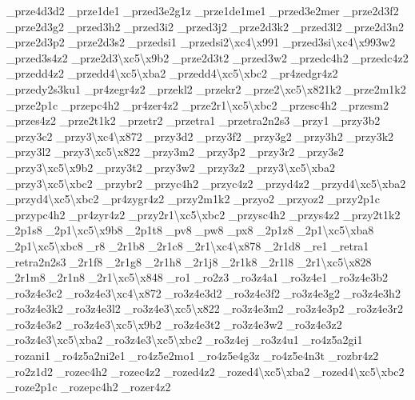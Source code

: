 \begin{DoxyCompactItemize}
\-\_\-prze4d3d2 \-\_\-prze1de1 \-\_\-przed3e2g1z \-\_\-prze1de1me1 \-\_\-przed3e2mer \-\_\-prze2d3f2 \-\_\-prze2d3g2 \-\_\-przed3h2 \-\_\-przed3i2 \-\_\-przed3j2 \-\_\-prze2d3k2 \-\_\-przed3l2 \-\_\-prze2d3n2 \-\_\-prze2d3p2 \-\_\-prze2d3s2 \-\_\-przedsi1 \-\_\-przedsi2\textbackslash{}xc4\textbackslash{}x991 \-\_\-przed3si\textbackslash{}xc4\textbackslash{}x993w2 \-\_\-przed3s4z2 \-\_\-prze2d3\textbackslash{}xc5\textbackslash{}x9b2 \-\_\-prze2d3t2 \-\_\-przed3w2 \-\_\-przedc4h2 \-\_\-przedc4z2 \-\_\-przedd4z2 \-\_\-przedd4\textbackslash{}xc5\textbackslash{}xba2 \-\_\-przedd4\textbackslash{}xc5\textbackslash{}xbc2 \-\_\-pr4zedgr4z2 \-\_\-przedy2s3ku1 \-\_\-pr4zegr4z2 \-\_\-przekl2 \-\_\-przekr2 \-\_\-prze2\textbackslash{}xc5\textbackslash{}x821k2 \-\_\-prze2m1k2 \-\_\-prze2p1c \-\_\-przepc4h2 \-\_\-pr4zer4z2 \-\_\-prze2r1\textbackslash{}xc5\textbackslash{}xbc2 \-\_\-przesc4h2 \-\_\-przesm2 \-\_\-przes4z2 \-\_\-prze2t1k2 \-\_\-przetr2 \-\_\-przetra1 \-\_\-przetra2n2s3 \-\_\-przy1 \-\_\-przy3b2 \-\_\-przy3c2 \-\_\-przy3\textbackslash{}xc4\textbackslash{}x872 \-\_\-przy3d2 \-\_\-przy3f2 \-\_\-przy3g2 \-\_\-przy3h2 \-\_\-przy3k2 \-\_\-przy3l2 \-\_\-przy3\textbackslash{}xc5\textbackslash{}x822 \-\_\-przy3m2 \-\_\-przy3p2 \-\_\-przy3r2 \-\_\-przy3s2 \-\_\-przy3\textbackslash{}xc5\textbackslash{}x9b2 \-\_\-przy3t2 \-\_\-przy3w2 \-\_\-przy3z2 \-\_\-przy3\textbackslash{}xc5\textbackslash{}xba2 \-\_\-przy3\textbackslash{}xc5\textbackslash{}xbc2 \-\_\-przybr2 \-\_\-przyc4h2 \-\_\-przyc4z2 \-\_\-przyd4z2 \-\_\-przyd4\textbackslash{}xc5\textbackslash{}xba2 \-\_\-przyd4\textbackslash{}xc5\textbackslash{}xbc2 \-\_\-pr4zygr4z2 \-\_\-przy2m1k2 \-\_\-przyo2 \-\_\-przyoz2 \-\_\-przy2p1c \-\_\-przypc4h2 \-\_\-pr4zyr4z2 \-\_\-przy2r1\textbackslash{}xc5\textbackslash{}xbc2 \-\_\-przysc4h2 \-\_\-przys4z2 \-\_\-przy2t1k2 \-\_\-2p1s8 \-\_\-2p1\textbackslash{}xc5\textbackslash{}x9b8 \-\_\-2p1t8 \-\_\-pv8 \-\_\-pw8 \-\_\-px8 \-\_\-2p1z8 \-\_\-2p1\textbackslash{}xc5\textbackslash{}xba8 \-\_\-2p1\textbackslash{}xc5\textbackslash{}xbc8 \-\_\-r8 \-\_\-2r1b8 \-\_\-2r1c8 \-\_\-2r1\textbackslash{}xc4\textbackslash{}x878 \-\_\-2r1d8 \-\_\-re1 \-\_\-retra1 \-\_\-retra2n2s3 \-\_\-2r1f8 \-\_\-2r1g8 \-\_\-2r1h8 \-\_\-2r1j8 \-\_\-2r1k8 \-\_\-2r1l8 \-\_\-2r1\textbackslash{}xc5\textbackslash{}x828 \-\_\-2r1m8 \-\_\-2r1n8 \-\_\-2r1\textbackslash{}xc5\textbackslash{}x848 \-\_\-ro1 \-\_\-ro2z3 \-\_\-ro3z4a1 \-\_\-ro3z4e1 \-\_\-ro3z4e3b2 \-\_\-ro3z4e3c2 \-\_\-ro3z4e3\textbackslash{}xc4\textbackslash{}x872 \-\_\-ro3z4e3d2 \-\_\-ro3z4e3f2 \-\_\-ro3z4e3g2 \-\_\-ro3z4e3h2 \-\_\-ro3z4e3k2 \-\_\-ro3z4e3l2 \-\_\-ro3z4e3\textbackslash{}xc5\textbackslash{}x822 \-\_\-ro3z4e3m2 \-\_\-ro3z4e3p2 \-\_\-ro3z4e3r2 \-\_\-ro3z4e3s2 \-\_\-ro3z4e3\textbackslash{}xc5\textbackslash{}x9b2 \-\_\-ro3z4e3t2 \-\_\-ro3z4e3w2 \-\_\-ro3z4e3z2 \-\_\-ro3z4e3\textbackslash{}xc5\textbackslash{}xba2 \-\_\-ro3z4e3\textbackslash{}xc5\textbackslash{}xbc2 \-\_\-ro3z4ej \-\_\-ro3z4u1 \-\_\-ro4z5a2gi1 \-\_\-rozani1 \-\_\-ro4z5a2ni2e1 \-\_\-ro4z5e2mo1 \-\_\-ro4z5e4g3z \-\_\-ro4z5e4n3t \-\_\-rozbr4z2 \-\_\-ro2z1d2 \-\_\-rozec4h2 \-\_\-rozec4z2 \-\_\-rozed4z2 \-\_\-rozed4\textbackslash{}xc5\textbackslash{}xba2 \-\_\-rozed4\textbackslash{}xc5\textbackslash{}xbc2 \-\_\-roze2p1c \-\_\-rozepc4h2 \-\_\-rozer4z2 
\end{DoxyCompactItemize}
